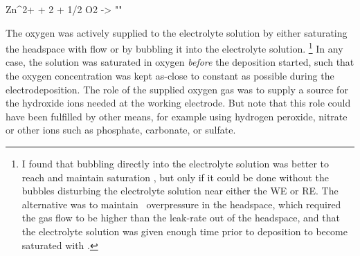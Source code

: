 \documentclass[draft,webedition,openright,titles,swedish,english]{LuaUUThesis}\usepackage[]{graphicx}\usepackage[]{xcolor}
\begin{document}
\hspace{14mm}%
\begin{minipage}{75mm}
   \vspace{-\baselineskip}
   \hrulefill
\end{minipage}
\begin{reaction}
Zn^{2+}\aq{} + 2 \electron{} + 1/2 O2\aq{} -> \ZnO\sld{} \phantom{ZnOZnOZnO}
 "\label{rxn:ZnO-dep}"
\end{reaction}
The oxygen was actively supplied to the electrolyte solution by either saturating
the headspace with  flow or by bubbling it into the electrolyte solution.%
\footnote{%
   I found that bubbling  directly into the electrolyte solution
   was better to reach and maintain saturation \ch{[O2\aq]}, but only if
   it could be done without the bubbles disturbing the electrolyte solution
   near either the \gls{WE} or \gls{RE}.
   The alternative was to maintain \oxygen\ overpressure in the headspace,
   which required the gas flow to be higher than the leak-rate out
   of the headspace, and that the electrolyte solution was given enough time
   prior to deposition to become saturated with \oxygen.
}
In any case, the solution was saturated in oxygen \emph{before} the deposition
started, such that the oxygen concentration was kept as-close to constant as possible
during the electrodeposition.
The role of the supplied oxygen gas was to supply a source for the hydroxide ions needed at
the working electrode. But note that this role could have been fulfilled by other means,
for example using hydrogen peroxide, nitrate or other ions such as phosphate,
carbonate, or sulfate.
\end{document}
